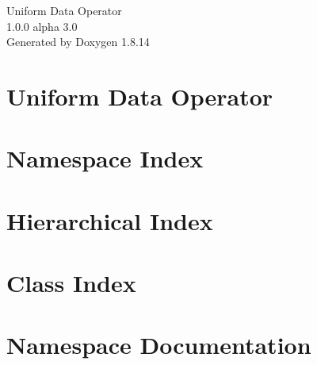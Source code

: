 \documentclass[twoside]{book}
\newcommand{\+}{\discretionary{\mbox{\scriptsize$\hookleftarrow$}}{}{}}
\newcommand{\clearemptydoublepage}{%
  \newpage{\pagestyle{empty}\cleardoublepage}%
}
\begin{document}
\hypersetup{pageanchor=false,
             bookmarksnumbered=true,
             pdfencoding=unicode
            }
\begin{titlepage}
\vspace*{7cm}
\begin{center}%
{\Large Uniform Data Operator \\[1ex]\large 1.\+0.\+0 alpha 3.\+0 }\\
\vspace*{1cm}
{\large Generated by Doxygen 1.8.14}\\
\end{center}
\end{titlepage}
\clearemptydoublepage
{}
\tableofcontents
\clearemptydoublepage
{}
\hypersetup{pageanchor=true}

\chapter{Uniform Data Operator}
\label{md__d_1__work__git_hub_uniform-data-operator__r_e_a_d_m_e}

\chapter{Namespace Index}

\chapter{Hierarchical Index}

\chapter{Class Index}

\chapter{Namespace Documentation}












\end{document}
